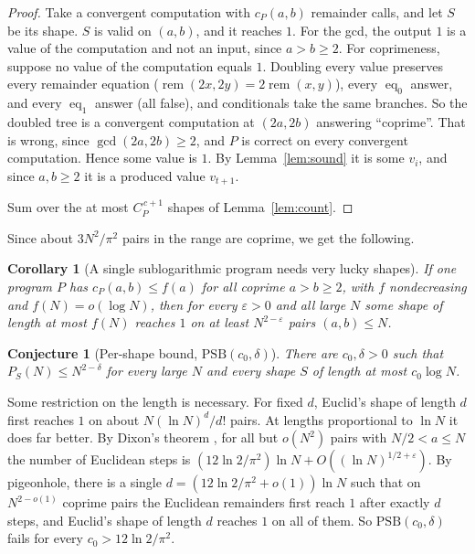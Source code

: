 \documentclass[11pt]{article}
\newtheorem{corollary}[theorem]{Corollary}
\newtheorem{conjecture}[theorem]{Conjecture}
\theoremstyle{remark}
\newcommand{\rem}{\operatorname{rem}}
\newcommand{\eq}{\operatorname{eq}}
\begin{document}
\begin{proof}
Take a convergent computation with $c_P(a,b)$ remainder calls, and let $S$ be
its shape. $S$ is valid on $(a,b)$, and it reaches $1$. For the gcd, the
output $1$ is a value of the computation and not an input, since
$a>b\geq2$. For coprimeness, suppose no value of the computation equals $1$.
Doubling every value preserves every remainder equation
($\rem(2x,2y)=2\rem(x,y)$), every $\eq_0$ answer, and every $\eq_1$ answer
(all false), and conditionals take the same branches. So the doubled tree is
a convergent computation at $(2a,2b)$ answering ``coprime''. That is wrong,
since $\gcd(2a,2b)\geq2$, and $P$ is correct on every convergent computation.
Hence some value is $1$. By Lemma~\ref{lem:sound} it is some $v_i$, and since
$a,b\geq2$ it is a produced value $v_{t+1}$.

Sum over the at most $C_P^{\,c+1}$ shapes of Lemma~\ref{lem:count}.
\end{proof}

Since about $3N^2/\pi^2$ pairs in the range are coprime, we get the following.

\begin{corollary}[A single sublogarithmic program needs very lucky shapes]\label{cor:lucky}
If one program $P$ has $c_P(a,b)\leq f(a)$ for all coprime $a>b\geq2$, with
$f$ nondecreasing and $f(N)=o(\log N)$, then for every $\varepsilon>0$ and all large $N$ some shape
of length at most $f(N)$ reaches $1$ on at least $N^{2-\varepsilon}$ pairs
$(a,b)\leq N$.
\end{corollary}

\begin{conjecture}[Per-shape bound, $\mathrm{PSB}(c_0,\delta)$]\label{conj:psb}
There are $c_0,\delta>0$ such that $P_S(N)\leq N^{2-\delta}$ for every large
$N$ and every shape $S$ of length at most $c_0\log N$.
\end{conjecture}

Some restriction on the length is necessary. For fixed $d$, Euclid's shape of
length $d$ first reaches $1$ on about $N(\ln N)^{d}/d!$ pairs. At lengths
proportional to $\ln N$ it does far better. By Dixon's theorem
\cite{dixon1970}, for all but $o(N^2)$ pairs with $N/2<a\leq N$ the number of
Euclidean steps is $(12\ln2/\pi^2)\ln N+O((\ln N)^{1/2+\varepsilon})$. By
pigeonhole, there is a single $d=(12\ln2/\pi^2+o(1))\ln N$ such that on
$N^{2-o(1)}$ coprime pairs the Euclidean remainders first reach $1$ after
exactly $d$ steps, and Euclid's shape of length $d$ reaches $1$ on all of them. So $\mathrm{PSB}(c_0,\delta)$ fails for
every $c_0>12\ln2/\pi^2$.
\end{document}
